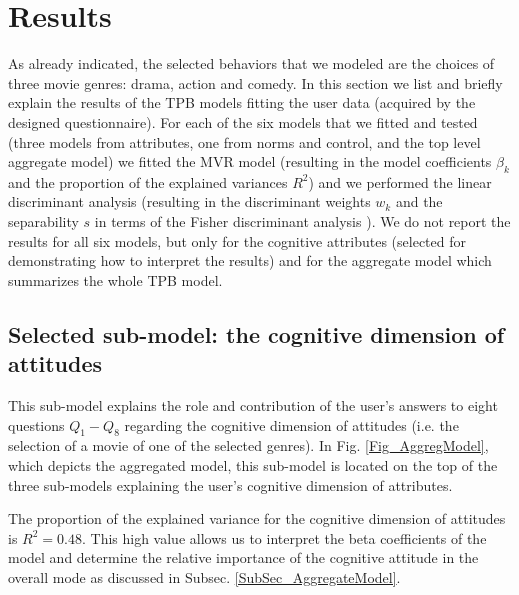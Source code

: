 \documentclass{llncs}
\begin{document}
\section{Results}\label{Sec_Results}

As already indicated, the selected behaviors that we modeled are the choices of three movie genres: drama, action and comedy. In this section we list and briefly explain the results of the TPB models fitting the user data (acquired by the designed questionnaire).  For each of the six models that we fitted and tested (three models from attributes, one from norms and control, and the top level aggregate model) we fitted the MVR model (resulting in the model coefficients $\beta_k$ and the proportion of the explained variances $R^2$) and we performed the linear discriminant analysis (resulting in the discriminant weights $w_k$ and the separability $s$ in terms of the Fisher discriminant analysis \cite{RencherChristensen201207}). We do not report the results for all six models, but only for the cognitive attributes (selected for demonstrating how to interpret the results) and for the aggregate model which summarizes the whole TPB model. 


\subsection{Selected sub-model: the cognitive dimension of attitudes}\label{SubSec_CogAttr}

This sub-model explains the role and contribution of the user's answers to eight questions $Q_1 - Q_8$ regarding the cognitive dimension of attitudes (i.e. the selection of a movie of one of the selected genres). In Fig. \ref{Fig_AggregModel}, which depicts the aggregated model, this sub-model is located on the top of the three sub-models explaining the user's cognitive dimension of attributes.

The proportion of the explained variance for the cognitive dimension of attitudes is $R^2=0.48$. This high value allows us to interpret the beta coefficients of the model and determine the relative importance of the cognitive attitude in the overall mode as discussed in Subsec. \ref{SubSec_AggregateModel}.
\end{document}
